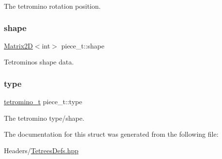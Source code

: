 The tetromino rotation position. \mbox{\label{structpiece__t_a3c8f9c2e51c6bab728e564143c439746}} 
\subsubsection{\texorpdfstring{shape}{shape}}
{\footnotesize\ttfamily \hyperlink{classMatrix2D}{Matrix2D}$<$int$>$ piece\+\_\+t\+::shape}

Tetromino\textquotesingle{}s shape data. \mbox{\label{structpiece__t_ac5cbbdb5ff335128af8ca9f491a4f543}} 
\subsubsection{\texorpdfstring{type}{type}}
{\footnotesize\ttfamily \hyperlink{TetreesDefs_8hpp_acd279a62a49ecee418dd808ac39a1795}{tetromino\+\_\+t} piece\+\_\+t\+::type}

The tetromino type/shape. 

The documentation for this struct was generated from the following file\+:\begin{DoxyCompactItemize}
\item 
Headers/\hyperlink{TetreesDefs_8hpp}{Tetrees\+Defs.\+hpp}\end{DoxyCompactItemize}
